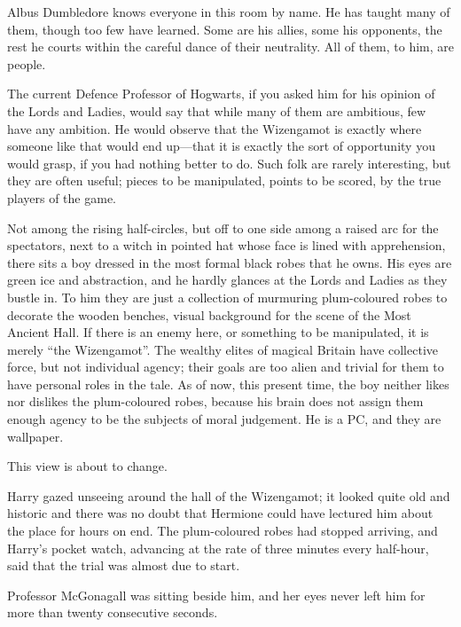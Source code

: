 Albus Dumbledore knows everyone in this room by name. He has taught many of them, though too few have learned. Some are his allies, some his opponents, the rest he courts within the careful dance of their neutrality. All of them, to him, are people.

The current Defence Professor of Hogwarts, if you asked him for his opinion of the Lords and Ladies, would say that while many of them are ambitious, few have any ambition. He would observe that the Wizengamot is exactly where someone like that would end up—that it is exactly the sort of opportunity you would grasp, if you had nothing better to do. Such folk are rarely interesting, but they are often useful; pieces to be manipulated, points to be scored, by the true players of the game.

Not among the rising half-circles, but off to one side among a raised arc for the spectators, next to a witch in pointed hat whose face is lined with apprehension, there sits a boy dressed in the most formal black robes that he owns. His eyes are green ice and abstraction, and he hardly glances at the Lords and Ladies as they bustle in. To him they are just a collection of murmuring plum-coloured robes to decorate the wooden benches, visual background for the scene of the Most Ancient Hall. If there is an enemy here, or something to be manipulated, it is merely “the Wizengamot”. The wealthy elites of magical Britain have collective force, but not individual agency; their goals are too alien and trivial for them to have personal roles in the tale. As of now, this present time, the boy neither likes nor dislikes the plum-coloured robes, because his brain does not assign them enough agency to be the subjects of moral judgement. He is a PC, and they are wallpaper.

This view is about to change.

\later

Harry gazed unseeing around the hall of the Wizengamot; it looked quite old and historic and there was no doubt that Hermione could have lectured him about the place for hours on end. The plum-coloured robes had stopped arriving, and Harry’s pocket watch, advancing at the rate of three minutes every half-hour, said that the trial was almost due to start.

Professor McGonagall was sitting beside him, and her eyes never left him for more than twenty consecutive seconds.

